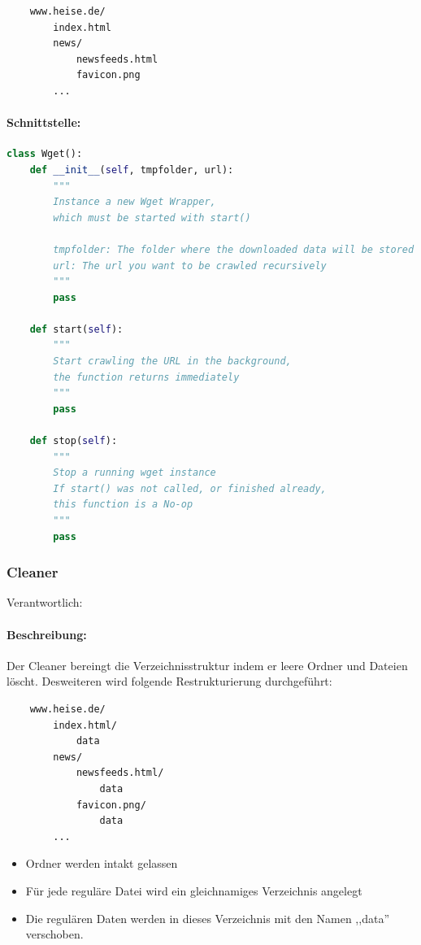\begin{verbatim}
    www.heise.de/
        index.html
        news/
            newsfeeds.html
            favicon.png
        ...
\end{verbatim}

\paragraph{Schnittstelle:}
\label{par:schnittstelle_}
\hfill
\begin{lstlisting}[language=python]
class Wget():
    def __init__(self, tmpfolder, url):
        """
        Instance a new Wget Wrapper,
        which must be started with start()

        tmpfolder: The folder where the downloaded data will be stored
        url: The url you want to be crawled recursively
        """
        pass

    def start(self): 
        """
        Start crawling the URL in the background,
        the function returns immediately
        """
        pass

    def stop(self):
        """
        Stop a running wget instance
        If start() was not called, or finished already,
        this function is a No-op
        """
        pass
\end{lstlisting}


\newpage
\subsubsection{Cleaner}
\label{ssub:cleaner}
Verantwortlich: \ci 
\paragraph{Beschreibung:}
\label{par:beschreibung_}
Der Cleaner bereingt die Verzeichnisstruktur indem er leere Ordner und Dateien löscht.
Desweiteren wird folgende Restrukturierung durchgeführt:
\begin{verbatim}
    www.heise.de/ 
        index.html/
            data
        news/
            newsfeeds.html/
                data
            favicon.png/
                data
        ...
\end{verbatim}


\begin{itemize}
    \item Ordner werden intakt gelassen
    \item Für jede reguläre Datei wird ein gleichnamiges Verzeichnis angelegt
    \item Die regulären Daten werden in dieses Verzeichnis mit den Namen ,,data'' verschoben.
\end{itemize}

